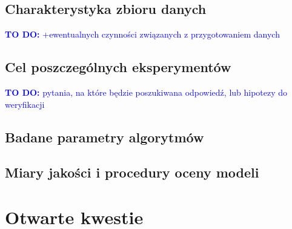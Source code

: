 \documentclass{article}
\newcommand{\todo}[1]{\textcolor{blue}{\textbf{TO DO:} #1}}
\begin{document}
\subsection{Charakterystyka zbioru danych}
\todo{+ewentualnych czynności związanych z przygotowaniem danych}
\subsection{Cel poszczególnych eksperymentów}
\todo{pytania, na które będzie poszukiwana odpowiedź, lub hipotezy do weryfikacji}
\subsection{Badane parametry algorytmów}
\subsection{Miary jakości i procedury oceny modeli}
\section{Otwarte kwestie}


\end{document}
